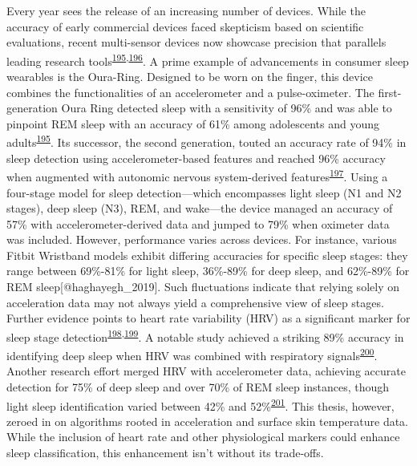 \documentclass[
  10pt,
]{scrbook}
\begin{document}
Every year sees the release of an increasing number of devices. While
the accuracy of early commercial devices faced skepticism based on
scientific evaluations, recent multi-sensor devices now showcase
precision that parallels leading research
tools\textsuperscript{\protect\hyperlink{ref-dezambotti_2019}{195},\protect\hyperlink{ref-rentz_2021}{196}}.
A prime example of advancements in consumer sleep wearables is the
Oura-Ring. Designed to be worn on the finger, this device combines the
functionalities of an accelerometer and a pulse-oximeter. The
first-generation Oura Ring detected sleep with a sensitivity of 96\% and
was able to pinpoint REM sleep with an accuracy of 61\% among
adolescents and young
adults\textsuperscript{\protect\hyperlink{ref-dezambotti_2019}{195}}.
Its successor, the second generation, touted an accuracy rate of 94\% in
sleep detection using accelerometer-based features and reached 96\%
accuracy when augmented with autonomic nervous system-derived
features\textsuperscript{\protect\hyperlink{ref-altini_2021}{197}}.
Using a four-stage model for sleep detection---which encompasses light
sleep (N1 and N2 stages), deep sleep (N3), REM, and wake---the device
managed an accuracy of 57\% with accelerometer-derived data and jumped
to 79\% when oximeter data was included. However, performance varies
across devices. For instance, various Fitbit Wristband models exhibit
differing accuracies for specific sleep stages: they range between
69\%-81\% for light sleep, 36\%-89\% for deep sleep, and 62\%-89\% for
REM sleep{[}@haghayegh\_2019{]}. Such fluctuations indicate that relying
solely on acceleration data may not always yield a comprehensive view of
sleep stages. Further evidence points to heart rate variability (HRV) as
a significant marker for sleep stage
detection\textsuperscript{\protect\hyperlink{ref-herzig_2018}{198},\protect\hyperlink{ref-chouchou_2014}{199}}.
A notable study achieved a striking 89\% accuracy in identifying deep
sleep when HRV was combined with respiratory
signals\textsuperscript{\protect\hyperlink{ref-long_2017}{200}}. Another
research effort merged HRV with accelerometer data, achieving accurate
detection for 75\% of deep sleep and over 70\% of REM sleep instances,
though light sleep identification varied between 42\% and
52\%\textsuperscript{\protect\hyperlink{ref-muzet_2016}{201}}. This
thesis, however, zeroed in on algorithms rooted in acceleration and
surface skin temperature data. While the inclusion of heart rate and
other physiological markers could enhance sleep classification, this
enhancement isn't without its trade-offs.
\end{document}
